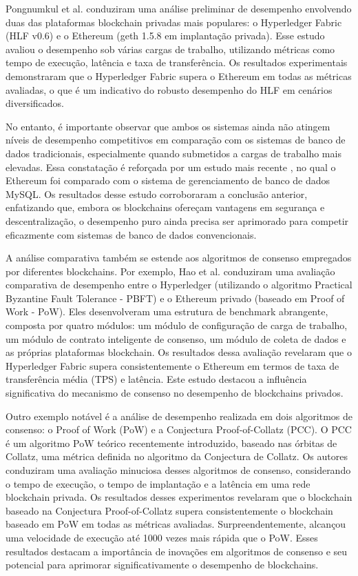       Pongnumkul et al. \cite{Performance-analysis} conduziram uma análise preliminar de desempenho envolvendo duas das plataformas blockchain privadas mais populares: o Hyperledger Fabric (HLF v0.6) e o Ethereum (geth 1.5.8 em implantação privada). Esse estudo avaliou o desempenho sob várias cargas de trabalho, utilizando métricas como tempo de execução, latência e taxa de transferência. Os resultados experimentais demonstraram que o Hyperledger Fabric supera o Ethereum em todas as métricas avaliadas, o que é um indicativo do robusto desempenho do HLF em cenários diversificados.

        No entanto, é importante observar que ambos os sistemas ainda não atingem níveis de desempenho competitivos em comparação com os sistemas de banco de dados tradicionais, especialmente quando submetidos a cargas de trabalho mais elevadas. Essa constatação é reforçada por um estudo mais recente \cite{comparative-testing}, no qual o Ethereum foi comparado com o sistema de gerenciamento de banco de dados MySQL. Os resultados desse estudo corroboraram a conclusão anterior, enfatizando que, embora os blockchains ofereçam vantagens em segurança e descentralização, o desempenho puro ainda precisa ser aprimorado para competir eficazmente com sistemas de banco de dados convencionais.

        A análise comparativa também se estende aos algoritmos de consenso empregados por diferentes blockchains. Por exemplo, Hao et al. \cite{analise-algoritmo-consenso} conduziram uma avaliação comparativa de desempenho entre o Hyperledger (utilizando o algoritmo Practical Byzantine Fault Tolerance - PBFT) e o Ethereum privado (baseado em Proof of Work - PoW). Eles desenvolveram uma estrutura de benchmark abrangente, composta por quatro módulos: um módulo de configuração de carga de trabalho, um módulo de contrato inteligente de consenso, um módulo de coleta de dados e as próprias plataformas blockchain. Os resultados dessa avaliação revelaram que o Hyperledger Fabric supera consistentemente o Ethereum em termos de taxa de transferência média (TPS) e latência. Este estudo destacou a influência significativa do mecanismo de consenso no desempenho de blockchains privados.

        Outro exemplo notável é a análise de desempenho realizada em dois algoritmos de consenso: o Proof of Work (PoW) e a Conjectura Proof-of-Collatz (PCC)\cite{avaliacao-algo-consenso}. O PCC \cite{conjectura} é um algoritmo PoW teórico recentemente introduzido, baseado nas órbitas de Collatz, uma métrica definida no algoritmo da Conjectura de Collatz. Os autores conduziram uma avaliação minuciosa desses algoritmos de consenso, considerando o tempo de execução, o tempo de implantação e a latência em uma rede blockchain privada. Os resultados desses experimentos revelaram que o blockchain baseado na Conjectura Proof-of-Collatz supera consistentemente o blockchain baseado em PoW em todas as métricas avaliadas. Surpreendentemente, alcançou uma velocidade de execução até 1000 vezes mais rápida que o PoW. Esses resultados destacam a importância de inovações em algoritmos de consenso e seu potencial para aprimorar significativamente o desempenho de blockchains.

